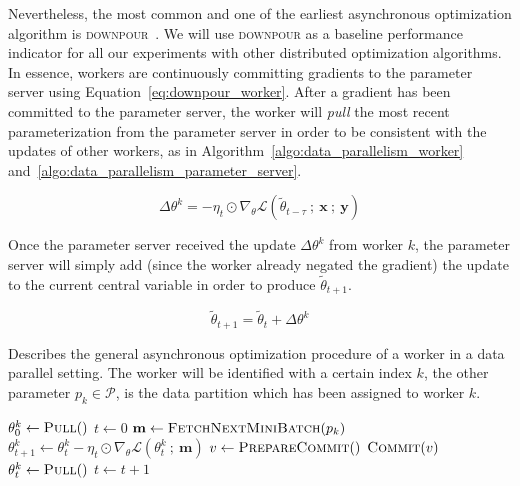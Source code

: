 Nevertheless, the most common and one of the earliest asynchronous optimization algorithm is \textsc{downpour}~\cite{dean2012large}. We will use \textsc{downpour} as a baseline performance indicator for all our experiments with other distributed optimization algorithms. In essence, workers are continuously committing gradients to the parameter server using Equation~\ref{eq:downpour_worker}. After a gradient has been committed to the parameter server, the worker will \emph{pull} the most recent parameterization from the parameter server in order to be consistent with the updates of other workers, as in Algorithm~\ref{algo:data_parallelism_worker} and~\ref{algo:data_parallelism_parameter_server}.

\begin{equation}
  \label{eq:downpour_worker}
  \Delta \theta^k = - \eta_t \odot \nabla_\theta \mathcal{L}(\tilde{\theta}_{t-\tau}~;~\textbf{x}~;~\textbf{y})
\end{equation}

\newpage

Once the parameter server received the update $\Delta\theta^k$ from worker $k$, the parameter server will simply add (since the worker already negated the gradient) the update to the current central variable in order to produce $\tilde{\theta}_{t+1}$.

\begin{equation}
  \label{eq:downpour_parameter_server}
  \tilde{\theta}_{t+1} = \tilde{\theta}_t + \Delta \theta^k
\end{equation}

\vspace*{\fill}

\begin{algorithm}
  \caption{Describes the general asynchronous optimization procedure of a worker in a data parallel setting. The worker will be identified with a certain index $k$, the other parameter $p_k \in \mathcal{P}$, is the data partition which has been assigned to worker $k$.}
  \label{algo:data_parallelism_worker}
  \begin{algorithmic}[1]
    \State $\theta^k_0 \gets \Call{Pull}{ }$
    \State $t \gets 0$
    \State $\textbf{m} \gets \Call{FetchNextMiniBatch}{p_k}$
    \State $\theta^k_{t + 1} \gets \theta^k_t - \eta_t \odot \nabla_\theta \mathcal{L}(\theta^k_t~;~\textbf{m})$ 
    \State $v \gets \Call{PrepareCommit}{ }$
    \State $\Call{Commit}{v}$
    \State $\theta^k_t \gets \Call{Pull}{ }$
    \State $t \gets t + 1$
    \EndWhile
    \EndProcedure
  \end{algorithmic}
\end{algorithm}

